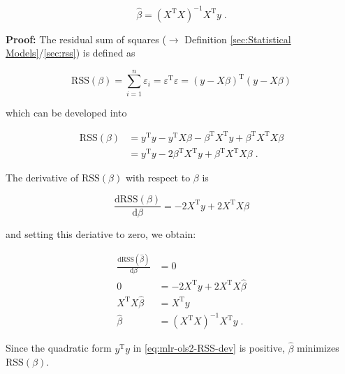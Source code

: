 \documentclass[a4paper,12pt,twoside]{book}
\begin{document}
\begin{equation} \label{eq:mlr-ols2-OLS}
\hat{\beta} = (X^\mathrm{T} X)^{-1} X^\mathrm{T} y \; .
\end{equation}


\vspace{1em}
\textbf{Proof:} The residual sum of squares ($\rightarrow$ Definition \ref{sec:Statistical Models}/\ref{sec:rss}) is defined as

\begin{equation} \label{eq:mlr-ols2-RSS}
\mathrm{RSS}(\beta) = \sum_{i=1}^n \varepsilon_i = \varepsilon^\mathrm{T} \varepsilon = (y-X\beta)^\mathrm{T} (y-X\beta)
\end{equation}

which can be developed into

\begin{equation} \label{eq:mlr-ols2-RSS-dev}
\begin{split}
\mathrm{RSS}(\beta) &= y^\mathrm{T} y - y^\mathrm{T} X \beta - \beta^\mathrm{T} X^\mathrm{T} y + \beta^\mathrm{T} X^\mathrm{T} X \beta \\
&= y^\mathrm{T} y - 2 \beta^\mathrm{T} X^\mathrm{T} y + \beta^\mathrm{T} X^\mathrm{T} X \beta \; .
\end{split}
\end{equation}

The derivative of $\mathrm{RSS}(\beta)$ with respect to $\beta$ is

\begin{equation} \label{eq:mlr-ols2-RSS-der}
\frac{\mathrm{d}\mathrm{RSS}(\beta)}{\mathrm{d}\beta} = - 2 X^\mathrm{T} y + 2 X^\mathrm{T} X \beta
\end{equation}

and setting this deriative to zero, we obtain:

\begin{equation} \label{eq:mlr-ols2-OLS-qed}
\begin{split}
\frac{\mathrm{d}\mathrm{RSS}(\hat{\beta})}{\mathrm{d}\beta} &= 0 \\
0 &= - 2 X^\mathrm{T} y + 2 X^\mathrm{T} X \hat{\beta} \\
X^\mathrm{T} X \hat{\beta} &= X^\mathrm{T} y \\
\hat{\beta} &= (X^\mathrm{T} X)^{-1} X^\mathrm{T} y \; .
\end{split}
\end{equation}

Since the quadratic form $y^\mathrm{T} y$ in \eqref{eq:mlr-ols2-RSS-dev} is positive, $\hat{\beta}$ minimizes $\mathrm{RSS}(\beta)$.
\end{document}

